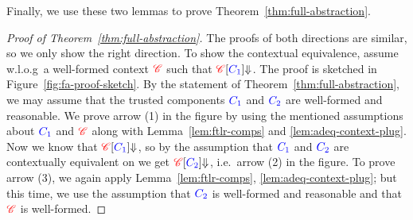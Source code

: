 Finally, we use these two lemmas to prove Theorem~\ref{thm:full-abstraction}.
\begin{proof}[Proof of Theorem~\ref{thm:full-abstraction}]
  The proofs of both directions are similar, so we only show the right direction.
  To show the \trgcm{} contextual equivalence, assume w.l.o.g\ a well-formed context $\trg{\context}$ such that ${\plug{\trg{\context}}{\src{\comp_1}} \term[]{}}$.
  The proof is sketched in Figure~\ref{fig:fa-proof-sketch}.
  By the statement of Theorem~\ref{thm:full-abstraction}, we may assume that the trusted components $\src{\comp_1}$ and $\src{\comp_2}$ are well-formed and reasonable.
  We prove arrow (1) in the figure by using the mentioned assumptions about $\src{\comp_1}$ and $\trg{\context}$ along with Lemma~\ref{lem:ftlr-comps} and \ref{lem:adeq-context-plug}.
  Now we know that ${\plug{\trg{\context}}{\src{\comp_1}} \sterm[]{}{}}$, so by the assumption that $\src{\comp_1}$ and $\src{\comp_2}$ are contextually equivalent on \srccm{} we get ${\plug{\trg{\context}}{\src{\comp_2}} \sterm[]{}{}}$, i.e.\ arrow (2) in the figure.
  To prove arrow (3), we again apply Lemma~\ref{lem:ftlr-comps}, \ref{lem:adeq-context-plug}; but this time, we use the assumption that $\src{\comp_2}$ is well-formed and reasonable and that $\trg{\context}$ is well-formed.
\end{proof}

